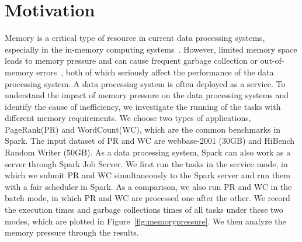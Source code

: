 \section{Motivation}
\label{sec:motivation}

Memory is a critical type of resource in current data processing systems, especially in the in-memory computing systems~\cite{shi:mammoth}. However, limited memory space leads to memory pressure and can cause frequent garbage collection or out-of-memory errors~\cite{fang2015interruptible}, both of which seriously affect the performance of the data processing system. A data processing system is often deployed as a service. To understand the impact of memory pressure on the data processing systems and identify the cause of inefficiency, we investigate the running of the tasks with different memory requirements. We choose two types of applications, PageRank(PR) and WordCount(WC), which are the common benchmarks in Spark. The input dataset of PR and WC are webbase-2001 (30GB) and HiBench Random Writer (50GB). As a data processing system, Spark can also work as a server through Spark Job Server. We first run the tasks in the service mode, in which we submit PR and WC simultaneously to the Spark server and run them with a fair scheduler in Spark. As a comparison, we also run PR and WC in the batch mode, in which PR and WC are processed one after the other. We record the execution times and garbage collections times of all tasks under these two modes, which are plotted in Figure~\ref{fig:memorypressure}. We then analyze the memory pressure through the results. 


